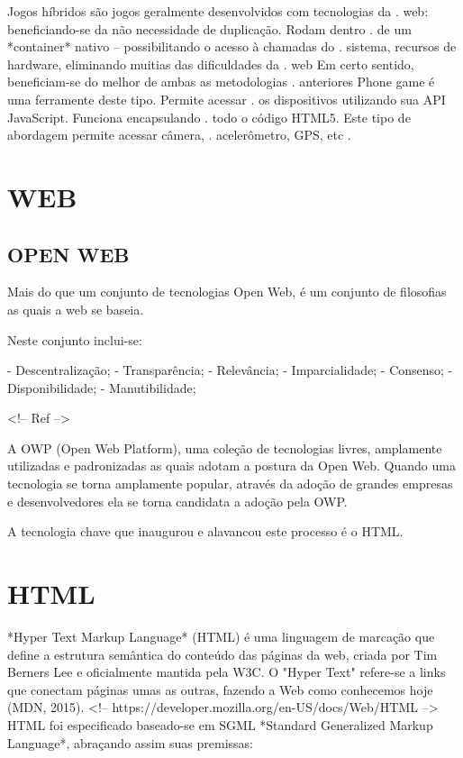 \documentclass[11pt,a4paper]{article}
\begin{document}
Jogos híbridos são jogos geralmente desenvolvidos com tecnologias da .
web: beneficiando-se da não necessidade de duplicação. Rodam dentro .
de um *container* nativo – possibilitando o acesso à chamadas do    .
sistema, recursos de hardware, eliminando muitias das dificuldades da  .
web Em certo sentido, beneficiam-se do melhor de ambas as metodologias .
anteriores Phone game é uma ferramente deste tipo. Permite acessar    .
os dispositivos utilizando sua API JavaScript. Funciona encapsulando   .
todo o código HTML5. Este tipo de abordagem permite acessar câmera,  .
acelerômetro, GPS, etc                                                .

\section{WEB}

\subsection{OPEN WEB}

Mais do que um conjunto de tecnologias Open Web, é um conjunto de
filosofias as quais a web se baseia.

Neste conjunto inclui-se:

- Descentralização;
- Transparência;
- Relevância;
- Imparcialidade;
- Consenso;
- Disponibilidade;
- Manutibilidade;

<!-- Ref
-->

A OWP (Open Web Platform), uma coleção de tecnologias livres,
amplamente utilizadas e padronizadas as quais adotam a postura da Open
Web. Quando uma tecnologia se torna amplamente popular, através da
adoção de grandes empresas e desenvolvedores ela se torna candidata a
adoção pela OWP.

A tecnologia chave que inaugurou e alavancou este processo é o HTML. 

\section{HTML}

*Hyper Text Markup Language* (HTML) é uma linguagem de marcação
que define a estrutura semântica do conteúdo das páginas da
web, criada por Tim Berners Lee e oficialmente mantida pela W3C.
O "Hyper Text" refere-se a links que conectam páginas umas as
outras, fazendo a Web como conhecemos hoje (MDN, 2015). <!--
https://developer.mozilla.org/en-US/docs/Web/HTML --> HTML foi
especificado baseado-se em SGML *Standard Generalized Markup Language*,
abraçando assim suas premissas:
\end{document}
